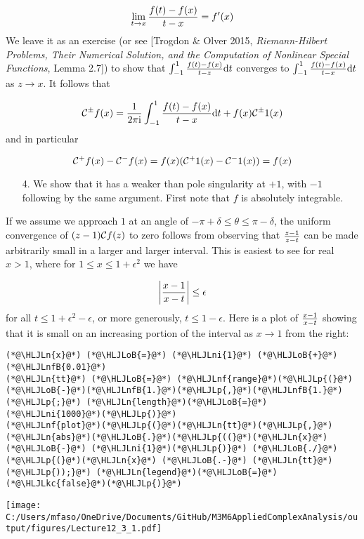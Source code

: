 \documentclass[12pt,a4paper]{article}
\newcommand{\HLJLkc}[1]{\textcolor[RGB]{59,151,46}{\textit{#1}}}
\newcommand{\HLJLn}[1]{#1}
\newcommand{\HLJLnf}[1]{\textcolor[RGB]{66,102,213}{#1}}
\newcommand{\HLJLnfB}[1]{\textcolor[RGB]{59,151,46}{#1}}
\newcommand{\HLJLni}[1]{\textcolor[RGB]{59,151,46}{#1}}
\newcommand{\HLJLoB}[1]{\textcolor[RGB]{102,102,102}{\textbf{#1}}}
\newcommand{\HLJLp}[1]{#1}
\def\D{ {\rm d} }
\def\I{ {\rm i} }
\def\CC{ {\cal C} }
\def\dt{\D t}
\begin{document}
\[
\lim_{t \rightarrow x} {f(t) - f(x) \over t - x} = f'(x)
\]
We leave it as an exercise (or see [Trogdon \& Olver 2015, \emph{Riemann-Hilbert Problems, Their Numerical Solution, and the Computation of Nonlinear Special Functions}, Lemma 2.7]) to show that $\int_{-1}^1 {f(t) - f(x) \over t - z} \dt$ converges to $\int_{-1}^1 {f(t) - f(x) \over t - x} \dt$ as $z \rightarrow x$. It follows that

\[
{\cal C}^\pm f(x) =   {1 \over 2 \pi \I} \int_{-1}^1 {f(t) - f(x) \over t - x} \dt + f(x) \CC^\pm 1(x)
\]
and in particular

\[
{\cal C}^+ f(x) - {\cal C}^- f(x)  =  f(x) (\CC^+ 1(x) - \CC^- 1(x)) = f(x)
\]
\begin{itemize}
\item[4. ] We show that it has a weaker than pole singularity at $+1$, with $-1$ following by the same argument. First note that $f$ is absolutely integrable.

\end{itemize}
If we assume we approach $1$ at an angle of $-\pi + \delta \leq \theta \leq \pi - \delta$, the uniform convergence of $(z - 1) \CC f(z)$ to zero follows from observing that ${z-1 \over z - t}$ can be made arbitrarily small in a larger and larger interval. This is easiest to see for real $x > 1$, where for  $1 \leq x \leq 1 + \epsilon^2$ we have

\[
\left|{x -1 \over x-t }\right| \leq \epsilon
\]
for all $t \leq 1 + \epsilon^2 - \epsilon$, or more generously, $t \leq 1 - \epsilon$. Here is a plot of ${x - 1 \over x- t}$ showing that it is small on an increasing portion of the interval as $x \rightarrow 1$ from the right:


\begin{lstlisting}
(*@\HLJLn{x}@*) (*@\HLJLoB{=}@*) (*@\HLJLni{1}@*) (*@\HLJLoB{+}@*) (*@\HLJLnfB{0.01}@*)
(*@\HLJLn{tt}@*) (*@\HLJLoB{=}@*) (*@\HLJLnf{range}@*)(*@\HLJLp{(}@*)(*@\HLJLoB{-}@*)(*@\HLJLnfB{1.}@*)(*@\HLJLp{,}@*)(*@\HLJLnfB{1.}@*)(*@\HLJLp{;}@*) (*@\HLJLn{length}@*)(*@\HLJLoB{=}@*)(*@\HLJLni{1000}@*)(*@\HLJLp{)}@*)
(*@\HLJLnf{plot}@*)(*@\HLJLp{(}@*)(*@\HLJLn{tt}@*)(*@\HLJLp{,}@*) (*@\HLJLn{abs}@*)(*@\HLJLoB{.}@*)(*@\HLJLp{((}@*)(*@\HLJLn{x}@*) (*@\HLJLoB{-}@*) (*@\HLJLni{1}@*)(*@\HLJLp{)}@*) (*@\HLJLoB{./}@*) (*@\HLJLp{(}@*)(*@\HLJLn{x}@*) (*@\HLJLoB{.-}@*) (*@\HLJLn{tt}@*)(*@\HLJLp{));}@*) (*@\HLJLn{legend}@*)(*@\HLJLoB{=}@*)(*@\HLJLkc{false}@*)(*@\HLJLp{)}@*)
\end{lstlisting}

\texttt{[image: C:/Users/mfaso/OneDrive/Documents/GitHub/M3M6AppliedComplexAnalysis/output/figures/Lecture12\_3\_1.pdf]}
\end{document}
